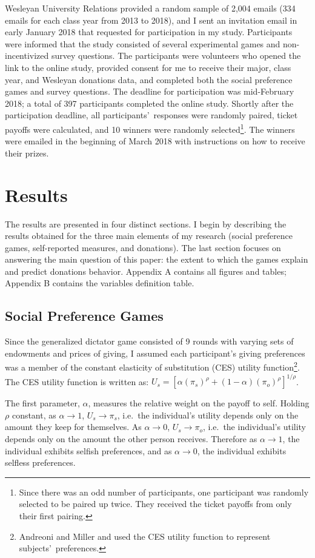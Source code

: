 \documentclass[12pt]{article}
\begin{document}
Wesleyan University Relations provided a random sample of 2,004 emails (334 emails for each class year from 2013 to 2018), and I sent an invitation email in early January 2018 that requested for participation in my study. Participants were informed that the study consisted of several experimental games and non-incentivized survey questions. The participants were volunteers who opened the link to the online study, provided consent for me to receive their major, class year, and Wesleyan donations data, and completed both the social preference games and survey questions. The deadline for participation was mid-February 2018; a total of 397 participants completed the online study. Shortly after the participation deadline, all participants\rq \ responses were randomly paired, ticket payoffs were calculated, and 10 winners were randomly selected\footnote{Since there was an odd number of participants, one participant was randomly selected to be paired up twice. They received the ticket payoffs from only their first pairing.}. The winners were emailed in the beginning of March 2018 with instructions on how to receive their prizes.

\section{Results}
The results are presented in four distinct sections. I begin by describing the results obtained for the three main elements of my research (social preference games, self-reported measures, and donations). The last section focuses on answering the main question of this paper: the extent to which the games explain and predict donations behavior. Appendix A contains all figures and tables; Appendix B contains the variables definition table.

\subsection{Social Preference Games}
Since the generalized dictator game consisted of 9 rounds with varying sets of endowments and prices of giving, I assumed each participant\rq s giving preferences was a member of the constant elasticity of substitution (CES) utility function\footnote{Andreoni and Miller and \cite{fisman_kariv_markovits_2007} used the CES utility function to represent subjects\rq \ preferences.}.  The CES utility function is written as: \(U_{s} = [\alpha(\pi_{s})^{\rho} + (1-\alpha)(\pi_{o})^{\rho}]^{1/\rho}\).

The first parameter, \(\alpha\), measures the relative weight on the payoff to self. Holding \(\rho\) constant, as \(\alpha \rightarrow 1\), \(U_{s} \rightarrow \pi_{s}\), i.e.\ the individual\rq s utility depends only on the amount they keep for themselves. As \(\alpha \rightarrow 0\), \(U_{s} \rightarrow \pi_{o}\), i.e.\ the individual\rq s utility depends only on the amount the other person receives. Therefore as \(\alpha \rightarrow 1\), the individual exhibits selfish preferences, and as \(\alpha \rightarrow 0\), the individual exhibits selfless preferences.
\end{document}
